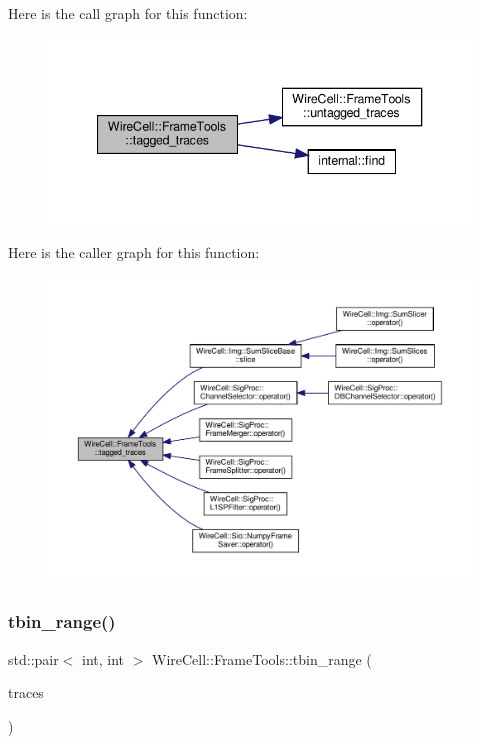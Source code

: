 Here is the call graph for this function\+:
\nopagebreak
\begin{figure}[H]
\begin{center}
\leavevmode
\includegraphics[width=340pt]{namespace_wire_cell_1_1_frame_tools_ab75409594f96814edb45d39db9d705f6_cgraph}
\end{center}
\end{figure}
Here is the caller graph for this function\+:
\nopagebreak
\begin{figure}[H]
\begin{center}
\leavevmode
\includegraphics[width=350pt]{namespace_wire_cell_1_1_frame_tools_ab75409594f96814edb45d39db9d705f6_icgraph}
\end{center}
\end{figure}
\mbox{\label{namespace_wire_cell_1_1_frame_tools_a9031f0d7465146236c47308c347d05a1}} 
\subsubsection{\texorpdfstring{tbin\+\_\+range()}{tbin\_range()}}
{\footnotesize\ttfamily std\+::pair$<$ int, int $>$ Wire\+Cell\+::\+Frame\+Tools\+::tbin\+\_\+range (\begin{DoxyParamCaption}\item[{const \hyperlink{class_wire_cell_1_1_i_data_ae1a9f863380499bb43f39fabb6276660}{I\+Trace\+::vector} \&}]{traces }\end{DoxyParamCaption})}

